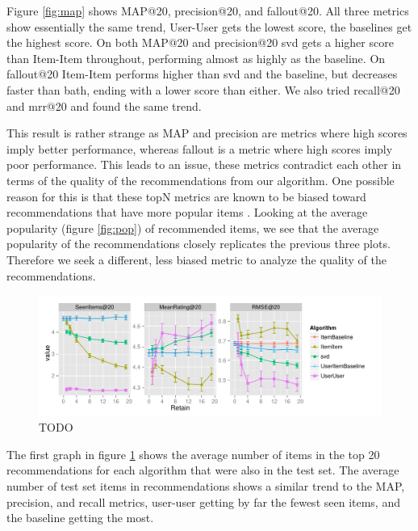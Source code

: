 \documentclass[letterpaper]{sig-alternate}
\begin{document}
  Figure \ref{fig:map} shows MAP@20, precision@20, and fallout@20.
  All three metrics show essentially the same trend, User-User gets the lowest score, the baselines get the highest score.
  On both MAP@20 and precision@20 svd gets a higher score than Item-Item throughout, performing almost as highly as the baseline.
  On fallout@20 Item-Item performs higher than svd and the baseline, but decreases faster than bath, ending with a lower score than either. 
  We also tried recall@20 and mrr@20 and found the same trend.

  This result is rather strange as MAP and precision are metrics where high scores imply better performance, whereas fallout is a metric where high scores imply poor performance.
  This leads to an issue, these metrics contradict each other in terms of the quality of the recommendations from our algorithm.
  One possible reason for this is that these topN metrics are known to be biased toward recommendations that have more popular items \cite{bellogin}.
  Looking at the average popularity (figure \ref{fig:pop}) of recommended items, we see that the average popularity of the recommendations closely replicates the previous three plots.
  Therefore we seek a different, less biased metric to analyze the quality of the recommendations.



\begin{figure}[ht!]
  \centering
  \includegraphics[width=1.1\linewidth]{../lenskit/output/ekstrandTuned20/rmse_20.pdf}
  \caption{TODO}
  \label{fig:topN.rmse}
\end{figure}


  The first graph in figure \ref{fig:topN.rmse} shows the average number of items in the top 20 recommendations for each algorithm that were also in the test set.
  The average number of test set items in recommendations shows a similar trend to the MAP, precision, and recall metrics, user-user getting by far the fewest seen items, and the baseline getting the most.
\end{document}
